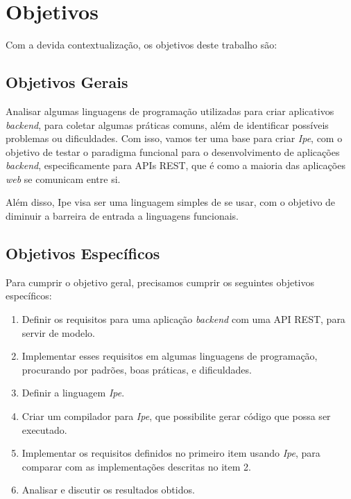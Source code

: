 \section{Objetivos}\label{sec:objectives}

Com a devida contextualização, os objetivos deste trabalho são:

\subsection{Objetivos Gerais}

Analisar algumas linguagens de programação utilizadas para criar aplicativos
\textit{backend}, para coletar algumas práticas comuns, além de identificar
possíveis problemas ou dificuldades. Com isso, vamos ter uma base
para criar \textit{Ipe}, com o objetivo de testar o paradigma funcional para o
desenvolvimento de aplicações \textit{backend}, especificamente para APIs REST,
que é como a maioria das aplicações \textit{web} se comunicam entre si.

Além disso, Ipe visa ser uma linguagem simples de se usar, com o objetivo de
diminuir a barreira de entrada a linguagens funcionais.

\subsection{Objetivos Específicos}

Para cumprir o objetivo geral, precisamos cumprir os seguintes objetivos específicos:

\begin{enumerate}
      \item Definir os requisitos para uma aplicação \textit{backend} com uma API
            REST, para servir de modelo.
      \item Implementar esses requisitos em algumas linguagens de programação,
            procurando por padrões, boas práticas, e dificuldades.
      \item Definir a linguagem \textit{Ipe}.
      \item Criar um compilador para \textit{Ipe}, que possibilite gerar código
            que possa ser executado.
      \item Implementar os requisitos definidos no primeiro item usando \textit{Ipe},
            para comparar com as implementações descritas no item 2.
      \item Analisar e discutir os resultados obtidos.
\end{enumerate}


